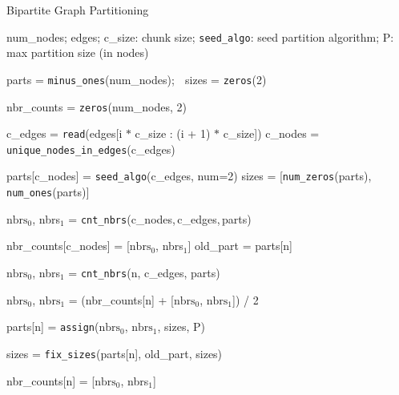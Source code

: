 \begin{algorithm}[t]\small
    \caption{\partitioning Bipartite Graph Partitioning}
    \label{alg:partition_algo} 
    \begin{algorithmic}[1] 
        \REQUIRE num\_nodes; edges; c\_size: chunk size; \texttt{seed\_algo}: seed partition algorithm; P: max partition size (in nodes)
    
        \STATE parts = \texttt{minus\_ones}(num\_nodes); $\;$ sizes = \texttt{zeros}(2) 
        
        \STATE nbr\_counts = \texttt{zeros}(num\_nodes, 2)

            \STATE c\_edges = \texttt{read}(edges[i $*$ c\_size : (i + 1) $*$ c\_size])
            \STATE c\_nodes = \texttt{unique\_nodes\_in\_edges}(c\_edges)

                \STATE parts[c\_nodes] = \texttt{seed\_algo}(c\_edges, num=2)
                \STATE sizes = [\texttt{num\_zeros}(parts), \texttt{num\_ones}(parts)]
                
                \STATE $\text{nbrs}_0$, nbrs$_1$ = \texttt{cnt\_nbrs}(c\_nodes,$\,$c\_edges,$\,$parts)
                
                \STATE nbr\_counts[c\_nodes] = [$\text{nbrs}_0$, nbrs$_1$]
            \ELSE
                    \STATE old\_part = parts[n]
                
                    \STATE $\text{nbrs}_0$, nbrs$_1$ = \texttt{cnt\_nbrs}(n, c\_edges, parts)
                    
                        \STATE $\text{nbrs}_0$, $\text{nbrs}_1$ = (nbr\_counts[n] + [$\text{nbrs}_0$, $\text{nbrs}_1$]) / 2
                    \ENDIF
                    
                    \STATE parts[n] = \texttt{assign}($\text{nbrs}_0$, $\text{nbrs}_1$, sizes, P)

                    \STATE sizes = \texttt{fix\_sizes}(parts[n], old\_part, sizes)
                    
                    \STATE nbr\_counts[n] = [$\text{nbrs}_0$, nbrs$_1$]
                \ENDFOR
            \ENDIF
        \ENDFOR
    \end{algorithmic}
\end{algorithm}



